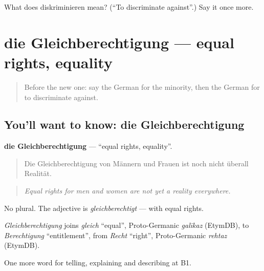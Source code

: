 \begin{tcolorbox}[breakable,colback=teal!4,colframe=teal!35!black,title={Before you move on}]
What does diskriminieren mean? (\textquotedblleft{}To discriminate against\textquotedblright{}.) Say it once more.
\end{tcolorbox}
\section[die Gleichberechtigung]{die Gleichberechtigung — equal rights, equality}

\label{lesson:GE-C360-gleichberechtigung}



\begin{quote}
Before the new one: say the German for the minority, then the German for to discriminate against.
\end{quote}

\subsection*{You'll want to know: die Gleichberechtigung}
\textbf{die Gleichberechtigung} — \textquotedblleft{}equal rights, equality\textquotedblright{}.

\begin{quote}
Die Gleichberechtigung von Männern und Frauen ist noch nicht überall Realität.
\end{quote}

\begin{quote}
\emph{Equal rights for men and women are not yet a reality everywhere.}
\end{quote}

No plural. The adjective is \emph{gleichberechtigt} — with equal rights.

\begin{cousinweb}
\emph{Gleichberechtigung} joins \emph{gleich} \textquotedblleft{}equal\textquotedblright{}, Proto-Germanic \emph{galīkaz} (EtymDB), to \emph{Berechtigung} \textquotedblleft{}entitlement\textquotedblright{}, from \emph{Recht} \textquotedblleft{}right\textquotedblright{}, Proto-Germanic \emph{rehtaz} (EtymDB).
\end{cousinweb}

\begin{grammarlens}[title={What you've built}]
One more word for telling, explaining and describing at B1.
\end{grammarlens}

